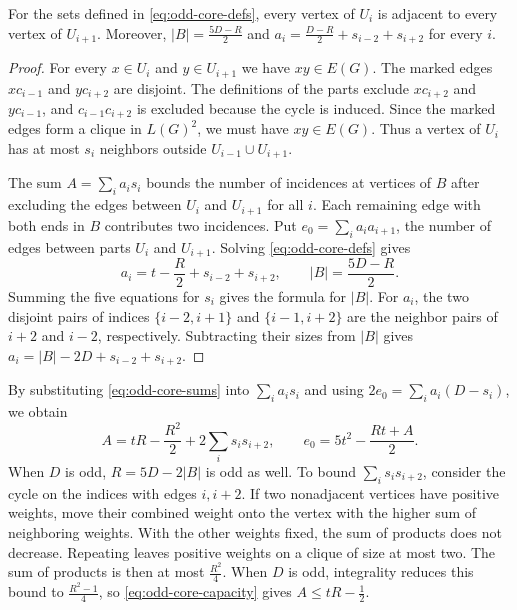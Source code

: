 \begin{lemma}\label{lem:simple-cycle-counts}
For the sets defined in \eqref{eq:odd-core-defs}, every vertex of
$U_i$ is adjacent to every vertex of $U_{i+1}$. Moreover,
$|B|=\frac{5D-R}{2}$ and $a_i=\frac{D-R}{2}+s_{i-2}+s_{i+2}$ for every $i$.
\end{lemma}

\begin{proof}
For every $x\in U_i$ and $y\in U_{i+1}$ we have $xy\in E(G)$. The
marked edges $xc_{i-1}$ and $yc_{i+2}$ are disjoint. The
definitions of the parts exclude $xc_{i+2}$ and $yc_{i-1}$, and
$c_{i-1}c_{i+2}$ is excluded because the cycle is induced. Since
the marked edges form a clique in $L(G)^2$, we must have
$xy\in E(G)$. Thus a vertex of $U_i$ has at most $s_i$ neighbors
outside $U_{i-1}\cup U_{i+1}$.

The sum $A=\sum_i a_i s_i$ bounds the number of incidences at vertices
of $B$ after excluding the edges between $U_i$ and $U_{i+1}$ for all
$i$. Each remaining edge with both ends in $B$ contributes two
incidences. Put $e_0=\sum_i a_i a_{i+1}$, the number of edges between
parts $U_i$ and $U_{i+1}$.
Solving \eqref{eq:odd-core-defs} gives
\begin{equation}\label{eq:odd-core-sums}
 a_i=t-\frac{R}{2}+s_{i-2}+s_{i+2},\qquad
 |B|=\frac{5D-R}{2}.
\end{equation}
Summing the five equations for $s_i$ gives the formula for $|B|$.
For $a_i$, the two disjoint pairs of indices
$\{i-2,i+1\}$ and $\{i-1,i+2\}$ are the neighbor pairs of
$i+2$ and $i-2$, respectively. Subtracting their sizes from $|B|$
gives $a_i=|B|-2D+s_{i-2}+s_{i+2}$.
\end{proof}

By substituting \eqref{eq:odd-core-sums} into $\sum_i a_i s_i$
and using $2e_0=\sum_i a_i(D-s_i)$, we obtain
\begin{equation}\label{eq:odd-core-capacity}
 A=tR-\frac{R^2}{2}+2\sum_i s_i s_{i+2},
 \qquad
 e_0=5t^2-\frac{Rt+A}{2}.
\end{equation}
When $D$ is odd, $R=5D-2|B|$ is odd as well. To bound $\sum_i s_i s_{i+2}$,
consider the cycle on the indices with edges $i,i+2$. If two
nonadjacent vertices have positive weights, move their combined
weight onto the vertex with the higher sum of neighboring weights.
With the other weights fixed, the sum of products does not decrease.
Repeating leaves positive weights on a clique of size at most two.
The sum of products is then at most $\frac{R^2}{4}$. When $D$ is odd, integrality reduces this bound to $\frac{R^2-1}{4}$, so
\eqref{eq:odd-core-capacity} gives $A\leq tR-\frac{1}{2}$.


